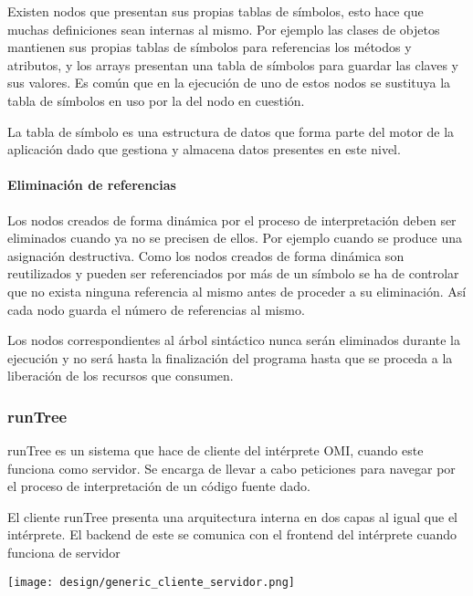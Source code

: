 Existen nodos que presentan sus propias tablas de símbolos, esto hace que muchas definiciones sean internas al mismo. Por ejemplo las clases de objetos mantienen sus propias tablas
de símbolos para referencias los métodos y atributos, y los arrays presentan una tabla de símbolos para guardar las claves y sus valores. Es común que en la ejecución 
de uno de estos nodos se sustituya la tabla de símbolos en uso por la del nodo en cuestión.

La tabla de símbolo es una estructura de datos que forma parte del motor de la aplicación dado que gestiona y almacena datos presentes en este nivel. 

\paragraph{Eliminación de referencias}
Los nodos creados de forma dinámica por el proceso de interpretación deben ser eliminados cuando ya no se precisen de ellos. Por ejemplo cuando se produce una asignación destructiva. Como
los nodos creados de forma dinámica son reutilizados y pueden ser referenciados por más de un símbolo se ha de controlar que no exista ninguna referencia al mismo 
antes de proceder a su eliminación. Así cada nodo guarda el número de referencias al mismo.

Los nodos correspondientes al árbol sintáctico nunca serán eliminados durante la ejecución y no será hasta la finalización del programa hasta que se proceda a la liberación de los recursos 
que consumen.





\subsubsection{runTree}
runTree es un sistema que hace de cliente del intérprete OMI, cuando este funciona como servidor. Se encarga de llevar a cabo peticiones para navegar por el proceso de interpretación de un código
fuente dado. 

El cliente runTree presenta una arquitectura interna en dos capas al igual que el intérprete. El backend de este se comunica con el frontend del intérprete cuando funciona de servidor

\begin{center}
\texttt{[image: design/generic\_cliente\_servidor.png]} 
\end{center}

